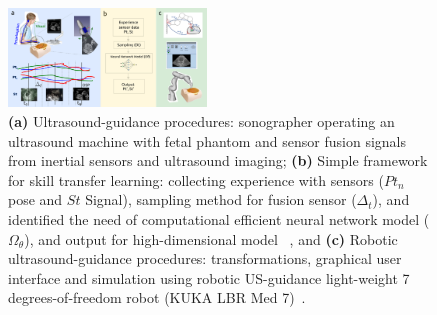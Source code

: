 \documentclass[a4paper, 10pt, conference]{ieeeconf}      %
\begin{document}
\begin{figure}[t]
\centering
\includegraphics[width=0.47\textwidth]{framework/outputs/drawing-v00} %
    \caption{
            \textbf{(a)} Ultrasound-guidance procedures:
		sonographer operating an ultrasound machine with fetal phantom and sensor fusion signals from inertial sensors and ultrasound imaging;
            \textbf{(b)} Simple framework for skill transfer learning: 
		collecting experience with sensors ($Pt_n$ pose and $St$ Signal), sampling method for fusion sensor ($\Delta_t$), and identified the need of computational efficient neural network model ($\Omega_\theta$), and output for high-dimensional model ~\cite{deng2021}, and 
            \textbf{(c)} Robotic ultrasound-guidance procedures:
		transformations, graphical user interface and simulation using robotic US-guidance light-weight 7 degrees-of-freedom robot (KUKA LBR Med 7)~\cite{Gerlach2022, Ipsen2021}.
       }
\label{fig:main}
\end{figure}

\end{document}
